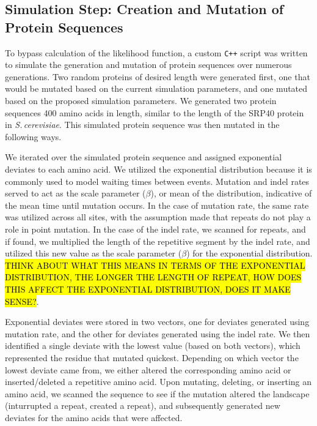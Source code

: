 \documentclass[10pt]{article}
\newcommand{\scshrt}{\mbox{\textit{S.\,cerevisiae}}\xspace}
\begin{document}
\subsection{Simulation Step: Creation and Mutation of Protein Sequences}

To bypass calculation of the likelihood function, a custom \texttt{C++} script was written to simulate the generation and mutation of protein sequences over numerous generations. Two random proteins of desired length were generated first, one that would be mutated based on the current simulation parameters, and one mutated based on the proposed simulation parameters. We generated two protein sequences 400 amino acids in length, similar to the length of the SRP40 protein in \scshrt. This simulated protein sequence was then  mutated in the following ways.

We iterated over the simulated protein sequence and assigned exponential deviates to each amino acid. We utilized the exponential distribution because it is commonly used to model waiting times between events. Mutation and indel rates served to act as the scale parameter ($\beta$), or mean of the distribution, indicative of the mean time until mutation occurs. In the case of mutation rate, the same rate was utilized across all sites, with the assumption made that repeats do not play a role in point mutation. In the case of the indel rate, we scanned for repeats, and if found, we multiplied the length of the repetitive segment by the indel rate, and utilized this new value as the scale parameter ($\beta$) for the exponential distribution. \hl{THINK ABOUT WHAT THIS MEANS IN TERMS OF THE EXPONENTIAL DISTRIBUTION, THE LONGER THE LENGTH OF REPEAT, HOW DOES THIS AFFECT THE EXPONENTIAL DISTRIBUTION, DOES IT MAKE SENSE?}.

Exponential deviates were stored in two vectors, one for deviates generated using mutation rate, and the other for deviates generated using the indel rate. We then identified a single deviate with the lowest value (based on both vectors), which represented the residue that mutated quickest. Depending on which vector the lowest deviate came from, we either altered the corresponding amino acid or inserted/deleted a repetitive amino acid. Upon mutating, deleting, or inserting an amino acid, we scanned the sequence to see if the mutation altered the landscape (inturrupted a repeat, created a repeat), and subsequently generated new deviates for the amino acids that were affected.
\end{document}
